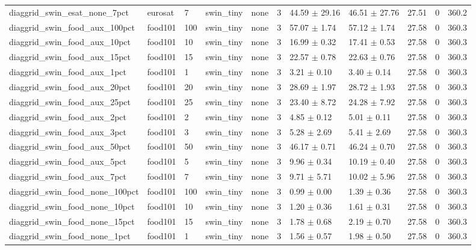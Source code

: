 \begin{tabular}{lllllllllll}
diaggrid_swin_esat_none_7pct & eurosat & 7 & swin_tiny & none & 3 & 44.59 $\pm$ 29.16 & 46.51 $\pm$ 27.76 & 27.51 & 0 & 360.2 \\
diaggrid_swin_food_aux_100pct & food101 & 100 & swin_tiny & none & 3 & 57.07 $\pm$ 1.74 & 57.12 $\pm$ 1.74 & 27.58 & 0 & 360.3 \\
diaggrid_swin_food_aux_10pct & food101 & 10 & swin_tiny & none & 3 & 16.99 $\pm$ 0.32 & 17.41 $\pm$ 0.53 & 27.58 & 0 & 360.3 \\
diaggrid_swin_food_aux_15pct & food101 & 15 & swin_tiny & none & 3 & 22.57 $\pm$ 0.78 & 22.63 $\pm$ 0.76 & 27.58 & 0 & 360.3 \\
diaggrid_swin_food_aux_1pct & food101 & 1 & swin_tiny & none & 3 & 3.21 $\pm$ 0.10 & 3.40 $\pm$ 0.14 & 27.58 & 0 & 360.3 \\
diaggrid_swin_food_aux_20pct & food101 & 20 & swin_tiny & none & 3 & 28.69 $\pm$ 1.97 & 28.72 $\pm$ 1.93 & 27.58 & 0 & 360.3 \\
diaggrid_swin_food_aux_25pct & food101 & 25 & swin_tiny & none & 3 & 23.40 $\pm$ 8.72 & 24.28 $\pm$ 7.92 & 27.58 & 0 & 360.3 \\
diaggrid_swin_food_aux_2pct & food101 & 2 & swin_tiny & none & 3 & 4.85 $\pm$ 0.12 & 5.01 $\pm$ 0.11 & 27.58 & 0 & 360.3 \\
diaggrid_swin_food_aux_3pct & food101 & 3 & swin_tiny & none & 3 & 5.28 $\pm$ 2.69 & 5.41 $\pm$ 2.69 & 27.58 & 0 & 360.3 \\
diaggrid_swin_food_aux_50pct & food101 & 50 & swin_tiny & none & 3 & 46.17 $\pm$ 0.71 & 46.24 $\pm$ 0.70 & 27.58 & 0 & 360.3 \\
diaggrid_swin_food_aux_5pct & food101 & 5 & swin_tiny & none & 3 & 9.96 $\pm$ 0.34 & 10.19 $\pm$ 0.40 & 27.58 & 0 & 360.3 \\
diaggrid_swin_food_aux_7pct & food101 & 7 & swin_tiny & none & 3 & 9.71 $\pm$ 5.71 & 10.02 $\pm$ 5.96 & 27.58 & 0 & 360.3 \\
diaggrid_swin_food_none_100pct & food101 & 100 & swin_tiny & none & 3 & 0.99 $\pm$ 0.00 & 1.39 $\pm$ 0.36 & 27.58 & 0 & 360.3 \\
diaggrid_swin_food_none_10pct & food101 & 10 & swin_tiny & none & 3 & 1.20 $\pm$ 0.36 & 1.61 $\pm$ 0.31 & 27.58 & 0 & 360.3 \\
diaggrid_swin_food_none_15pct & food101 & 15 & swin_tiny & none & 3 & 1.78 $\pm$ 0.68 & 2.19 $\pm$ 0.70 & 27.58 & 0 & 360.3 \\
diaggrid_swin_food_none_1pct & food101 & 1 & swin_tiny & none & 3 & 1.56 $\pm$ 0.57 & 1.98 $\pm$ 0.50 & 27.58 & 0 & 360.3 \\

\end{tabular}
